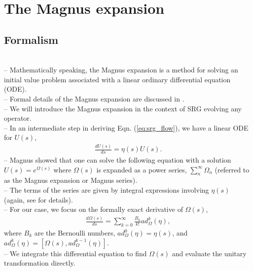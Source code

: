 \documentclass[preprintnumbers,floatfix,aps,prc,preprint,nofootinbib]{revtex4-1}
\begin{document}
\section{The Magnus expansion}
\label{sec:magnus_expansion}


\subsection{Formalism}
\label{sec:magnus_expansion_formalism}


\\
-- Mathematically speaking, the Magnus expansion is a method for solving an initial value problem associated with a linear ordinary differential equation (ODE).
\\
-- Formal details of the Magnus expansion are discussed in \cite{Blanes:2009ab}.
\\
-- We will introduce the Magnus expansion in the context of SRG evolving any operator.
\\
-- In an intermediate step in deriving Eqn. (\ref{eq:srg_flow}), we have a linear ODE for $U(s)$,
%
\begin{eqnarray}
	\label{eq:unitary_trans}
	\frac{dU(s)}{ds} = \eta(s) U(s).
\end{eqnarray}
%
-- Magnus showed that one can solve the following equation with a solution $U(s)=e^{\Omega(s)}$ where $\Omega(s)$ is expanded as a power series, $\sum_{n}^{\infty} \Omega_n$ (referred to as the Magnus expansion or Magnus series).
\\
-- The terms of the series are given by integral expressions involving $\eta(s)$ (again, see \cite{Blanes:2009ab, Magnus:1954zz} for details).
\\
-- For our case, we focus on the formally exact derivative of $\Omega(s)$,
%
\begin{eqnarray}
	\label{eq:magnus_omega}
	\frac{d\Omega(s)}{ds} = \sum_{k=0}^{\infty} \frac{B_k}{k!} ad_{\Omega}^{k}(\eta),
\end{eqnarray}
%
where $B_k$ are the Bernoulli numbers, $ad_{\Omega}^{0}(\eta)=\eta(s)$, and $ad_{\Omega}^{k}(\eta)=[\Omega(s),ad_{\Omega}^{k-1}(\eta)]$.
\\
-- We integrate this differential equation to find $\Omega(s)$ and evaluate the unitary transformation directly.
\end{document}
